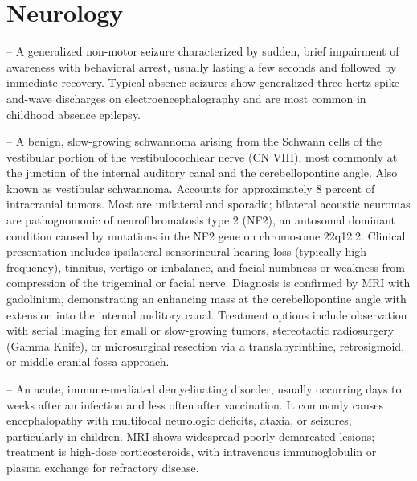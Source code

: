 \chapter{Neurology}

-- A generalized non-motor seizure characterized by sudden, brief impairment of awareness with behavioral arrest, usually lasting a few seconds and followed by immediate recovery. Typical absence seizures show generalized three-hertz spike-and-wave discharges on electroencephalography and are most common in childhood absence epilepsy.

-- A benign, slow-growing schwannoma arising from the Schwann cells of the vestibular portion of the vestibulocochlear nerve (CN VIII), most commonly at the junction of the internal auditory canal and the cerebellopontine angle. Also known as vestibular schwannoma. Accounts for approximately 8 percent of intracranial tumors. Most are unilateral and sporadic; bilateral acoustic neuromas are pathognomonic of neurofibromatosis type 2 (NF2), an autosomal dominant condition caused by mutations in the NF2 gene on chromosome 22q12.2. Clinical presentation includes ipsilateral sensorineural hearing loss (typically high-frequency), tinnitus, vertigo or imbalance, and facial numbness or weakness from compression of the trigeminal or facial nerve. Diagnosis is confirmed by MRI with gadolinium, demonstrating an enhancing mass at the cerebellopontine angle with extension into the internal auditory canal. Treatment options include observation with serial imaging for small or slow-growing tumors, stereotactic radiosurgery (Gamma Knife), or microsurgical resection via a translabyrinthine, retrosigmoid, or middle cranial fossa approach.

-- An acute, immune-mediated demyelinating disorder, usually occurring days to weeks after an infection and less often after vaccination. It commonly causes encephalopathy with multifocal neurologic deficits, ataxia, or seizures, particularly in children. MRI shows widespread poorly demarcated lesions; treatment is high-dose corticosteroids, with intravenous immunoglobulin or plasma exchange for refractory disease.

